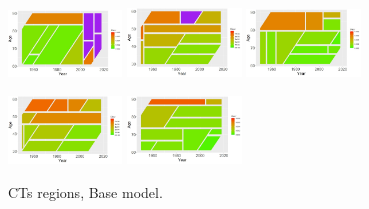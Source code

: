 \documentclass[fleqn,10pt]{wlscirep}
\begin{document}
\begin{figure}[H]
{\includegraphics[width=0.27\textwidth]{gbm_61.jpeg}}
{\includegraphics[width=0.27\textwidth]{xgbm.jpeg}}
{\includegraphics[width=0.27\textwidth]{xgbm_61.jpeg}}

{\includegraphics[width=0.27\textwidth]{xgbm_preproc.jpeg}}
{\includegraphics[width=0.27\textwidth]{xgbm_preproc_61.jpeg}}
\caption{CTs regions, Base model.}
\label{fig:CT}
\end{figure}
%
\end{document}
